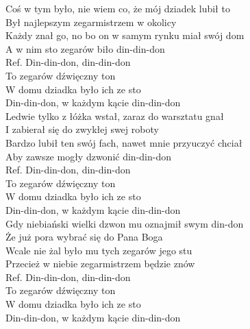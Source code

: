 
Coś w tym było, nie wiem co, że mój dziadek lubił to \\
Był najlepszym zegarmistrzem w okolicy \tab{}\\
Każdy znał go, no bo on w samym rynku miał swój dom \\
A w nim sto zegarów biło din-din-don \tab{}\\
\hops
Ref. Din-din-don, din-din-don \tab{}\tab{}\\
 To zegarów dźwięczny ton \tab{}\\
 W domu dziadka było ich ze sto \tab{}\\
 Din-din-don, w każdym kącie din-din-don \\
\hops
Ledwie tylko z łóżka wstał, zaraz do warsztatu gnał \\
I zabierał się do zwykłej swej roboty \\
Bardzo lubił ten swój fach, nawet mnie przyuczyć chciał \\
Aby zawsze mogły dzwonić din-din-don \\
\hops
Ref. Din-din-don, din-din-don \\
 To zegarów dźwięczny ton \\
 W domu dziadka było ich ze sto \\
 Din-din-don, w każdym kącie din-din-don \\
\hops
Gdy niebiański wielki dzwon mu oznajmił swym din-don \\
Że już pora wybrać się do Pana Boga \\
Wcale nie żal było mu tych zegarów jego stu \\
Przecież w niebie zegarmistrzem będzie znów \\
\hops
Ref. Din-din-don, din-din-don \\
 To zegarów dźwięczny ton \\
 W domu dziadka było ich ze sto \\
 Din-din-don, w każdym kącie din-din-don